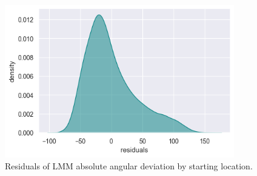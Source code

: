 \begin{figure}[!htb]
	\centering
	\includegraphics[width=100mm]{figures/residuals_angle_loc_23.png}
	\caption[Residuals of LMM absolute angular deviation by starting location]{Residuals of LMM absolute angular deviation by starting location.}
	\label{fig:resid_angle_loc}
\end{figure}
                                                                       
